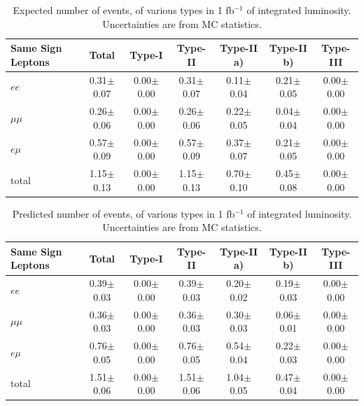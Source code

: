 \begin{table}[hbt]
\begin{center}
\begin{tabular}{|l|c|c|c|c|c|c|}\hline
Same Sign Leptons & Total &      Type-I &  Type-II & Type-II a) & Type-II b) & Type-III \\ \hline

$ee$ & 0.31$\pm$0.07 & 0.00$\pm$0.00 & 0.31$\pm$0.07 & 0.11$\pm$0.04 & 0.21$\pm$0.05 & 0.00$\pm$0.00 \\
$\mu\mu$ & 0.26$\pm$0.06 & 0.00$\pm$0.00 & 0.26$\pm$0.06 & 0.22$\pm$0.05 & 0.04$\pm$0.04 & 0.00$\pm$0.00 \\
$e\mu$ & 0.57$\pm$0.09 & 0.00$\pm$0.00 & 0.57$\pm$0.09 & 0.37$\pm$0.07 & 0.21$\pm$0.05 & 0.00$\pm$0.00 \\
total & 1.15$\pm$0.13 & 0.00$\pm$0.00 & 1.15$\pm$0.13 & 0.70$\pm$0.10 & 0.45$\pm$0.08 & 0.00$\pm$0.00 \\ \hline

\end{tabular}
\caption{ Expected number of \ttbar events, of various types in 1 fb$^{-1}$ of integrated luminosity. Uncertainties are from MC statistics.\label{tab:fakeOrigin1}}
\end{center}
\end{table}

\begin{table}[hbt]
\begin{center}
\begin{tabular}{|l|c|c|c|c|c|c|}\hline
Same Sign Leptons & Total &      Type-I &  Type-II & Type-II a) & Type-II b) & Type-III \\ \hline

$ee$ & 0.39$\pm$0.03 & 0.00$\pm$0.00 & 0.39$\pm$0.03 & 0.20$\pm$0.02 & 0.19$\pm$0.03 & 0.00$\pm$0.00 \\
$\mu\mu$ & 0.36$\pm$0.03 & 0.00$\pm$0.00 & 0.36$\pm$0.03 & 0.30$\pm$0.03 & 0.06$\pm$0.01 & 0.00$\pm$0.00 \\
$e\mu$ & 0.76$\pm$0.05 & 0.00$\pm$0.00 & 0.76$\pm$0.05 & 0.54$\pm$0.04 & 0.22$\pm$0.03 & 0.00$\pm$0.00 \\
total & 1.51$\pm$0.06 & 0.00$\pm$0.00 & 1.51$\pm$0.06 & 1.04$\pm$0.05 & 0.47$\pm$0.04 & 0.00$\pm$0.00 \\ \hline

\end{tabular}
\caption{ Predicted number of \ttbar events, of various types in 1 fb$^{-1}$ of integrated luminosity. Uncertainties are from MC statistics.\label{tab:fakeOrigin2}}
\end{center}
\end{table}

